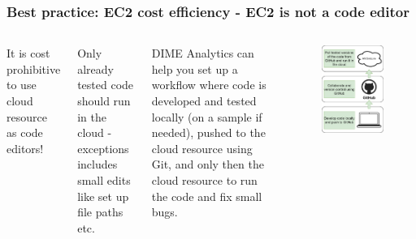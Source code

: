 \documentclass[aspectratio=169]{beamer} %
\begin{document}
\begin{frame}
	\frametitle{Best practice: EC2 cost efficiency - EC2 is not a code editor}

	\begin{columns}[c]

		It is cost prohibitive to use cloud resource as code editors!

		\vspace{.5cm}

		Only already tested code should run in the cloud
		- exceptions includes small edits like set up file paths etc.

		\vspace{.5cm}

		DIME Analytics can help you set up a workflow
		where code is developed and tested locally
		(on a sample if needed), 
		pushed to the cloud resource using Git,
		and only then the cloud resource 
		to run the code and fix small bugs.

		\begin{figure}
			\centering
			\includegraphics[width=.8\textwidth]{./img/code-workflow.png}
		\end{figure}
	\end{columns}
\end{frame}
\end{document}
